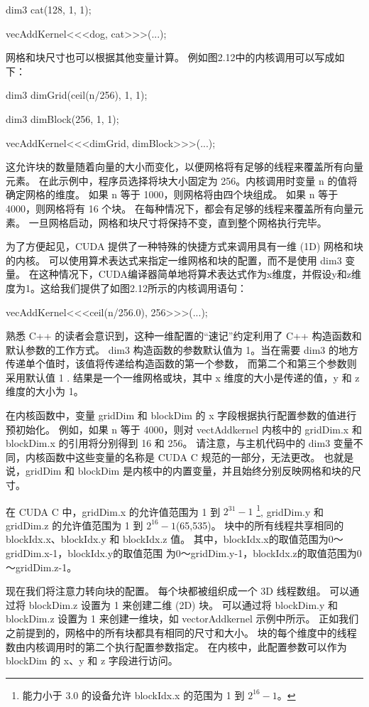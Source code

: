 dim3 cat(128, 1, 1);

vecAddKernel<<<dog, cat>>>(...);

网格和块尺寸也可以根据其他变量计算。 例如图2.12中的内核调用可以写成如下：

dim3 dimGrid(ceil(n/256), 1, 1);

dim3 dimBlock(256, 1, 1);

vecAddKernel<<<dimGrid, dimBlock>>>(...);

这允许块的数量随着向量的大小而变化，以便网格将有足够的线程来覆盖所有向量元素。 
在此示例中，程序员选择将块大小固定为 256。内核调用时变量 n 的值将确定网格的维度。 
如果 n 等于 1000，则网格将由四个块组成。 如果 n 等于 4000，则网格将有 16 个块。 
在每种情况下，都会有足够的线程来覆盖所有向量元素。 一旦网格启动，网格和块尺寸将保持不变，直到整个网格执行完毕。

为了方便起见，CUDA 提供了一种特殊的快捷方式来调用具有一维 (1D) 网格和块的内核。 
可以使用算术表达式来指定一维网格和块的配置，而不是使用 dim3 变量。 
在这种情况下，CUDA编译器简单地将算术表达式作为x维度，并假设y和z维度为1。这给我们提供了如图2.12所示的内核调用语句：

vecAddKernel<<<ceil(n/256.0), 256>>>(...);

熟悉 C++ 的读者会意识到，这种一维配置的“速记”约定利用了 C++ 构造函数和默认参数的工作方式。 
dim3 构造函数的参数默认值为 1。当在需要 dim3 的地方传递单个值时，该值将传递给构造函数的第一个参数，
而第二个和第三个参数则采用默认值 1 . 结果是一个一维网格或块，其中 x 维度的大小是传递的值，y 和 z 维度的大小为 1。

在内核函数中，变量 gridDim 和 blockDim 的 x 字段根据执行配置参数的值进行预初始化。 
例如，如果 n 等于 4000，则对 vectAddkernel 内核中的 gridDim.x 和 blockDim.x 的引用将分别得到 16 和 256。 
请注意，与主机代码中的 dim3 变量不同，内核函数中这些变量的名称是 CUDA C 规范的一部分，无法更改。 
也就是说，gridDim 和 blockDim 是内核中的内置变量，并且始终分别反映网格和块的尺寸。

在 CUDA C 中，gridDim.x 的允许值范围为 1 到 $2^{31} - 1$
\footnote{能力小于 3.0 的设备允许 blockIdx.x 的范围为 1 到 $2^{16} - 1$。},
gridDim.y 和 gridDim.z 的允许值范围为 1 到 $2^{16} - 1$(65,535)。 
块中的所有线程共享相同的 blockIdx.x、blockIdx.y 和 blockIdx.z 值。 
其中，blockIdx.x的取值范围为0～gridDim.x-1，blockIdx.y的取值范围
为0～gridDim.y-1，blockIdx.z的取值范围为0～gridDim.z-1。

现在我们将注意力转向块的配置。 每个块都被组织成一个 3D 线程数组。 可以通过将 blockDim.z 设置为 1 来创建二维 (2D) 块。
可以通过将 blockDim.y 和 blockDim.z 设置为 1 来创建一维块，如 vectorAddkernel 示例中所示。 
正如我们之前提到的，网格中的所有块都具有相同的尺寸和大小。 块的每个维度中的线程数由内核调用时的第二个执行配置参数指定。 
在内核中，此配置参数可以作为 blockDim 的 x、y 和 z 字段进行访问。

